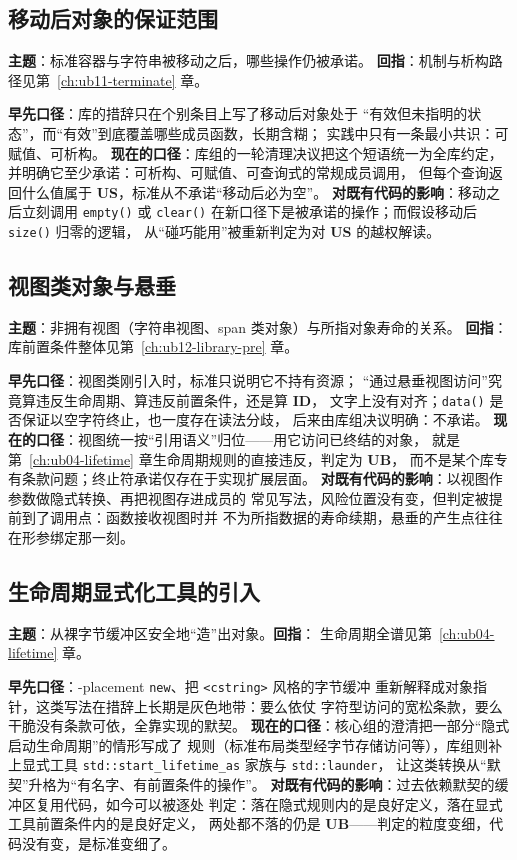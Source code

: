 \documentclass[12pt,a4paper,fontset=fandol]{ctexbook}
\newcommand{\Tp}[1]{\texttt{#1}}
\newcommand{\Bk}{\discretionary{}{}{}}
\newcommand{\UB}{\textbf{\textsf{UB}}}
\newcommand{\IDB}{\textbf{\textsf{ID}}}
\newcommand{\USB}{\textbf{\textsf{US}}}
\newcommand{\Hdr}[1]{\texttt{<#1>}}
\begin{document}
\subsection{移动后对象的保证范围}

\textbf{主题}：标准容器与字符串被移动之后，哪些操作仍被承诺。
\textbf{回指}：机制与析构路径见第~\ref{ch:ub11-terminate} 章。

\textbf{早先口径}：库的措辞只在个别条目上写了移动后对象处于
“有效但未指明的状态”，而“有效”到底覆盖哪些成员函数，长期含糊；
实践中只有一条最小共识：可赋值、可析构。
\textbf{现在的口径}：库组的一轮清理决议把这个短语统一为全库约定，
并明确它至少承诺：可析构、可赋值、可查询式的常规成员调用，
但每个查询返回什么值属于 \USB{}，标准从不承诺“移动后必为空”。
\textbf{对既有代码的影响}：移动之后立刻调用 \Tp{empty()} 或 \Tp{clear()}
在新口径下是被承诺的操作；而假设移动后 \Tp{size()} 归零的逻辑，
从“碰巧能用”被重新判定为对 \USB{} 的越权解读。

\subsection{视图类对象与悬垂}

\textbf{主题}：非拥有视图（字符串视图、span 类对象）与所指对象寿命的关系。
\textbf{回指}：库前置条件整体见第~\ref{ch:ub12-library-pre} 章。

\textbf{早先口径}：视图类刚引入时，标准只说明它不持有资源；
“通过悬垂视图访问”究竟算违反生命周期、算违反前置条件，还是算 \IDB{}，
文字上没有对齐；\Tp{data()} 是否保证以空字符终止，也一度存在读法分歧，
后来由库组决议明确：不承诺。
\textbf{现在的口径}：视图统一按“引用语义”归位——用它访问已终结的对象，
就是第~\ref{ch:ub04-lifetime} 章生命周期规则的直接违反，判定为 \UB{}，
而不是某个库专有条款问题；终止符承诺仅存在于实现扩展层面。
\textbf{对既有代码的影响}：以视图作参数做隐式转换、再把视图存进成员的
常见写法，风险位置没有变，但判定被提前到了调用点：函数接收视图时并
不为所指数据的寿命续期，悬垂的产生点往往在形参绑定那一刻。

\subsection{生命周期显式化工具的引入}

\textbf{主题}：从裸字节缓冲区安全地“造”出对象。\textbf{回指}：
生命周期全谱见第~\ref{ch:ub04-lifetime} 章。

\textbf{早先口径}：-placement \Tp{new}、把 \Hdr{cstring} 风格的字节缓冲
重新解释成对象指针，这类写法在措辞上长期是灰色地带：要么依仗
字符型访问的宽松条款，要么干脆没有条款可依，全靠实现的默契。
\textbf{现在的口径}：核心组的澄清把一部分“隐式启动生命周期”的情形写成了
规则（标准布局类型经字节存储访问等），库组则补上显式工具
\Tp{std::start{\Bk}\_lifetime{\Bk}\_as} 家族与 \Tp{std::launder}，
让这类转换从“默契”升格为“有名字、有前置条件的操作”。
\textbf{对既有代码的影响}：过去依赖默契的缓冲区复用代码，如今可以被逐处
判定：落在隐式规则内的是良好定义，落在显式工具前置条件内的是良好定义，
两处都不落的仍是 \UB{}——判定的粒度变细，代码没有变，是标准变细了。
\end{document}
